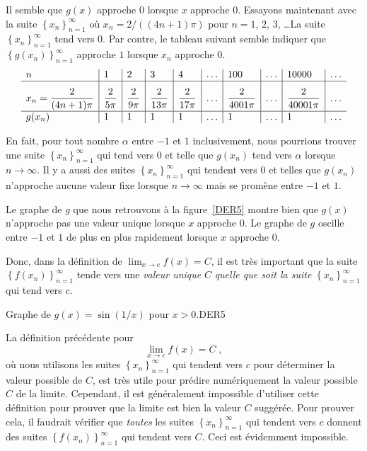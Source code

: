 {\begin{egg}
Il semble que $g(x)$ approche $0$ lorsque $x$ approche $0$.  Essayons
maintenant avec la suite $\displaystyle \left\{x_n\right\}_{n=1}^\infty$
où $x_n = 2/((4n+1)\pi)$ pour $n=1$, $2$, $3$, \ldots  La suite
$\displaystyle \left\{x_n\right\}_{n=1}^\infty$ tend vers $0$.  Par
contre, le tableau suivant semble indiquer que
$\displaystyle \left\{g(x_n)\right\}_{n=1}^\infty$
approche $1$ lorsque $x_n$ approche $0$.
\[
\begin{array}{l|l|l|l|l|l|l|l|l|l}
n & 1 & 2 & 3 & 4 & \ldots & 100 & \ldots & 10000 & \ldots \\
\hline
\rule[-1em]{0ex}{3em} \displaystyle x_n = \frac{2}{(4n+1)\pi} &
\displaystyle \frac{2}{5\pi} & \displaystyle \frac{2}{9\pi} &
\displaystyle \frac{2}{13\pi} & \displaystyle \frac{2}{17\pi} &
\ldots & \displaystyle \frac{2}{4001\pi} &
\ldots & \displaystyle \frac{2}{40001\pi} & \ldots \\
\hline
g(x_n) & 1 & 1 & 1 & 1 & \ldots & 1 & \ldots & 1 & \ldots
\end{array}
\]

En fait, pour tout nombre $\alpha$ entre $-1$ et $1$ inclusivement, nous
pourrions trouver une suite $\displaystyle \left\{x_n\right\}_{n=1}^\infty$
qui tend vers $0$ et telle que $g(x_n)$ tend vers $\alpha$ lorsque
$n\to \infty$.  Il y a aussi des suites
$\displaystyle \left\{x_n\right\}_{n=1}^\infty$ qui
tendent vers $0$ et telles que $g(x_n)$ n'approche aucune valeur fixe
lorsque $n \to \infty$ mais se promène entre $-1$ et $1$.

Le graphe de $g$ que nous retrouvons à la figure~\ref{DER5} montre bien
que $g(x)$ n'approche pas une valeur unique lorsque $x$ approche $0$.
Le graphe de $g$ oscille entre $-1$ et $1$ de plus en plus rapidement
lorsque $x$ approche $0$.

Donc, dans la définition de $\displaystyle \lim_{x\rightarrow c} f(x) = C$,
il est très important que la suite
$\displaystyle \left\{f(x_n)\right\}_{n=1}^\infty$ tende vers une
{\em valeur unique} $C$ {\em quelle que soit la suite}
$\displaystyle \left\{x_n\right\}_{n=1}^\infty$ qui tend vers $c$.
\end{egg}

{Graphe de $g(x) = \sin(1/x)$ pour $x >0$.}{DER5}

La définition précédente pour
\[
\lim_{x\rightarrow c} f(x) = C \; ,
\]
où nous utilisons les suites $\displaystyle \left\{x_n\right\}_{n=1}^\infty$
qui tendent vers $c$ pour déterminer la valeur possible de $C$, est
très utile pour prédire numériquement la valeur possible $C$ de la
limite. Cependant, il est généralement impossible d'utiliser cette
définition pour prouver que la limite est bien la valeur $C$ suggérée.
Pour prouver cela, il faudrait vérifier que {\em toutes} les suites
$\displaystyle \left\{x_n\right\}_{n=1}^\infty$ qui tendent vers $c$
donnent des suites $\displaystyle \left\{f(x_n)\right\}_{n=1}^\infty$
qui tendent vers $C$.  Ceci est évidemment impossible.

}
